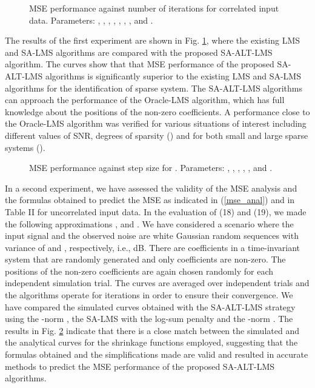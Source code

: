 \documentclass[10pt,onecolumn]{IEEEtran}
\begin{document}
\begin{figure}[!htb]
\begin{center}
\def\epsfsize#1#2{0.875\columnwidth}
 \vspace{-1.5em}\caption{MSE performance against
number of iterations for correlated input data. Parameters: , , , , , , , and .
}\label{fig2}
\end{center}
\end{figure}

The results of the first experiment are shown in Fig. \ref{fig2},
where the existing LMS and SA-LMS algorithms are compared with the
proposed SA-ALT-LMS algorithm. The curves show that that MSE
performance of the proposed SA-ALT-LMS algorithms is significantly
superior to the existing LMS and SA-LMS algorithms for the
identification of sparse system. The SA-ALT-LMS algorithms can
approach the performance of the Oracle-LMS algorithm, which has full
knowledge about the positions of the non-zero coefficients. A
performance close to the Oracle-LMS algorithm was verified for
various situations of interest including different values of SNR,
degrees of sparsity () and for both small and large sparse
systems ().

\begin{figure}[!htb]
\begin{center}
\def\epsfsize#1#2{0.875\columnwidth}
 \vspace{-1.35em}\caption{MSE performance against
step size for . Parameters: ,
, , , , and
. }\label{fig3}
\end{center}
\end{figure}

In a second experiment, we have assessed the validity of the MSE
analysis and the formulas obtained to predict the MSE as indicated
in (\ref{mse_anal}) and in Table II for uncorrelated input data. In
the evaluation of (18) and (19), we made the following
approximations ,  and
. We have considered a
scenario where the input signal and the observed noise are white
Gaussian random sequences with variance of  and ,
respectively, i.e.,  dB. There are 
coefficients in a time-invariant system that are randomly generated
and only  coefficients are non-zero. The positions of the
non-zero coefficients are again chosen randomly for each independent
simulation trial. The curves are averaged over  independent
trials and the algorithms operate for  iterations in order to
ensure their convergence. We have compared the simulated curves
obtained with the SA-ALT-LMS strategy using the -norm
\cite{chen}, {the SA-LMS with the log-sum penalty
\cite{chen,eksioglu,candes} and the -norm \cite{gu,eksioglu2}.}
The results in Fig. \ref{fig3} indicate that there is a close match
between the simulated and the analytical curves for the shrinkage
functions employed, suggesting that the formulas obtained and the
simplifications made are valid and resulted in accurate methods to
predict the MSE performance of the proposed SA-ALT-LMS algorithms.
\end{document}
